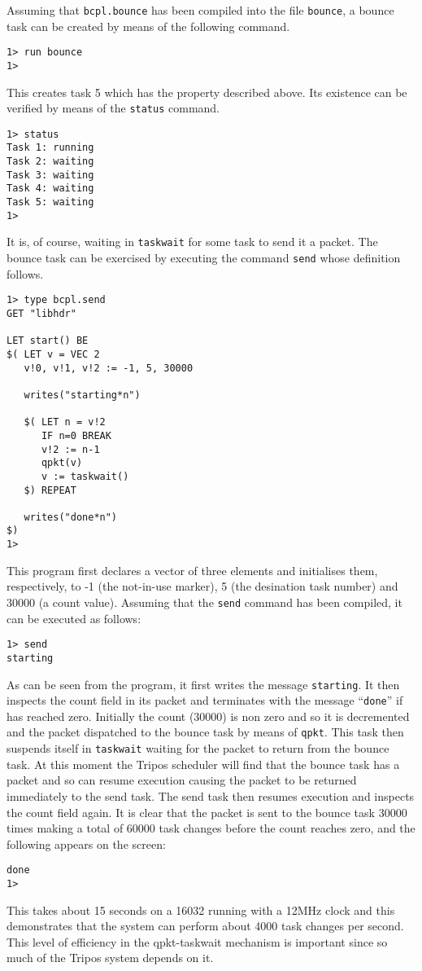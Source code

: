      Assuming that \verb|bcpl.bounce| has been compiled into the file
\verb|bounce|, a bounce task can be created by means of the following
command.
\begin{verbatim}
1> run bounce
1>
\end{verbatim}
This creates task 5 which has the property described above.  Its
existence can be verified by means of the \verb|status| command.
\begin{verbatim}
1> status
Task 1: running
Task 2: waiting
Task 3: waiting
Task 4: waiting
Task 5: waiting
1>
\end{verbatim}
It is, of course, waiting in \verb|taskwait| for some task to send it
a packet.  The bounce task can be exercised by executing the command
\verb|send| whose definition follows.
\begin{verbatim}
1> type bcpl.send
GET "libhdr"

LET start() BE
$( LET v = VEC 2
   v!0, v!1, v!2 := -1, 5, 30000

   writes("starting*n")

   $( LET n = v!2
      IF n=0 BREAK
      v!2 := n-1
      qpkt(v)
      v := taskwait()
   $) REPEAT

   writes("done*n")
$)
1>
\end{verbatim}
This program first declares a vector of three elements and initialises
them, respectively, to -1 (the not-in-use marker), 5 (the desination
task number) and 30000 (a count value).  Assuming that the \verb|send|
command has been compiled, it can be executed as follows:
\begin{verbatim}
1> send
starting
\end{verbatim}
As can be seen from the program, it first writes the message
\verb|starting|.  It then inspects the count field in its packet and
terminates with the message ``\verb|done|'' if has reached zero.
Initially the count (30000) is non zero and so it is decremented and
the packet dispatched to the bounce task by means of \verb|qpkt|.
This task then suspends itself in \verb|taskwait| waiting for the
packet to return from the bounce task.  At this moment the Tripos
scheduler will find that the bounce task has a packet and so can
resume execution causing the packet to be returned immediately to the
send task.  The send task then resumes execution and inspects the
count field again.  It is clear that the packet is sent to the bounce
task 30000 times making a total of 60000 task changes before the count
reaches zero, and the following appears on the screen:
\begin{verbatim}
done
1>
\end{verbatim}
This takes about 15 seconds on a 16032 running with a 12MHz clock and this 
demonstrates that the system can perform about 4000 task changes per second.  
This level of efficiency in the qpkt-taskwait mechanism is important since 
so much of the Tripos system depends on it.

